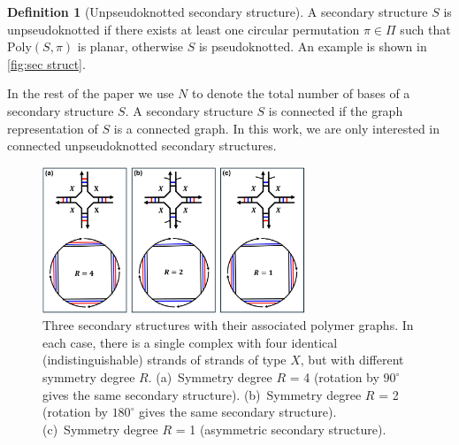 \documentclass[11pt,letterpaper]{article}  \usepackage[margin=1in]{geometry}
\theoremstyle{definition}  \newtheorem{Definition}[theorem]{Definition}
\newcommand{\PolySpi}{\ensuremath{\mathrm{Poly}(S,\pi)}\xspace}
\begin{document}
\begin{Definition}[Unpseudoknotted secondary structure]
	A secondary structure $S$ is unpseudoknotted if there exists at least one circular permutation $\pi \in \Pi$ such that $\PolySpi$ is planar, otherwise $S$ is pseudoknotted. 
	An example is shown in \cref{fig:sec struct}.
\end{Definition} 


\begin{remark}
	In the rest of the paper we use $N$ to denote the total number of bases of a secondary structure $S$.
	A secondary structure $S$ is connected if the graph representation of $S$ is a connected graph. In this work, we are only interested in connected unpseudoknotted secondary structures.
\end{remark}

\begin{figure}[t]
	\centering\includegraphics[width=0.7\textwidth]{figures/sym.jpg}
	
	\caption{Three secondary structures  with their associated polymer graphs. In each case, there is a single complex with four identical (indistinguishable) strands of  strands of type $X$, but with different symmetry degree $R$. 
		(a)~Symmetry degree $R$ = 4 (rotation by $90^{\circ}$  gives the same secondary structure). 
		(b)~Symmetry degree  $R$ = 2 (rotation by $180^{\circ}$  gives the same secondary structure). 
		(c)~Symmetry degree  $R$ = 1 (asymmetric secondary structure).
	}\label{fig:sym}
\end{figure}
\end{document}
